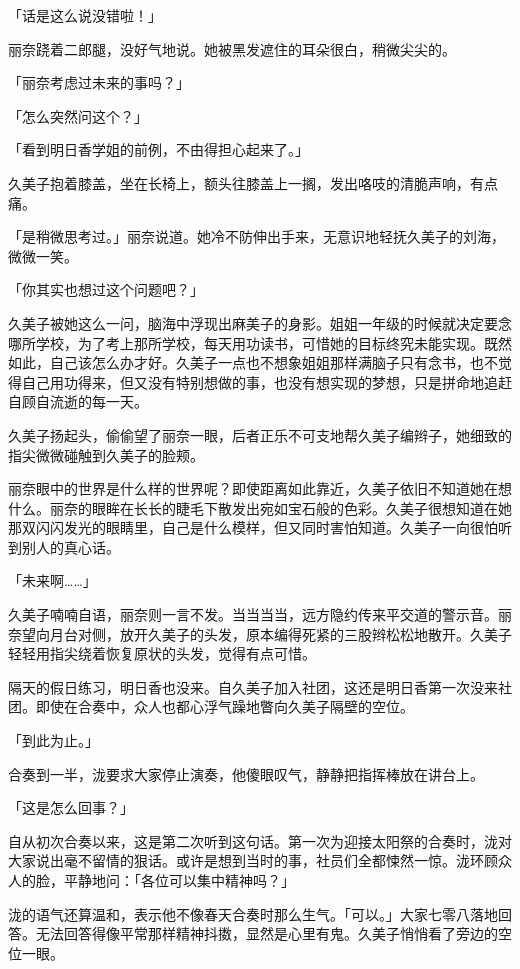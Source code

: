 \documentclass[UTF8]{ctexart}
\begin{document}
    「话是这么说没错啦！」 

    丽奈跷着二郎腿，没好气地说。她被黑发遮住的耳朵很白，稍微尖尖的。 

    「丽奈考虑过未来的事吗？」 

    「怎么突然问这个？」 

    「看到明日香学姐的前例，不由得担心起来了。」 

    久美子抱着膝盖，坐在长椅上，额头往膝盖上一搁，发出咯吱的清脆声响，有点痛。 

    「是稍微思考过。」丽奈说道。她冷不防伸出手来，无意识地轻抚久美子的刘海，微微一笑。 

    「你其实也想过这个问题吧？」 

    久美子被她这么一问，脑海中浮现出麻美子的身影。姐姐一年级的时候就决定要念哪所学校，为了考上那所学校，每天用功读书，可惜她的目标终究未能实现。既然如此，自己该怎么办才好。久美子一点也不想象姐姐那样满脑子只有念书，也不觉得自己用功得来，但又没有特别想做的事，也没有想实现的梦想，只是拼命地追赶自顾自流逝的每一天。 

    久美子扬起头，偷偷望了丽奈一眼，后者正乐不可支地帮久美子编辫子，她细致的指尖微微碰触到久美子的脸颊。 

    丽奈眼中的世界是什么样的世界呢？即使距离如此靠近，久美子依旧不知道她在想什么。丽奈的眼眸在长长的睫毛下散发出宛如宝石般的色彩。久美子很想知道在她那双闪闪发光的眼睛里，自己是什么模样，但又同时害怕知道。久美子一向很怕听到别人的真心话。 

    「未来啊……」 

    久美子喃喃自语，丽奈则一言不发。当当当当，远方隐约传来平交道的警示音。丽奈望向月台对侧，放开久美子的头发，原本编得死紧的三股辫松松地散开。久美子轻轻用指尖绕着恢复原状的头发，觉得有点可惜。 

    隔天的假日练习，明日香也没来。自久美子加入社团，这还是明日香第一次没来社团。即使在合奏中，众人也都心浮气躁地瞥向久美子隔壁的空位。 

    「到此为止。」 

    合奏到一半，泷要求大家停止演奏，他傻眼叹气，静静把指挥棒放在讲台上。 

    「这是怎么回事？」 

    自从初次合奏以来，这是第二次听到这句话。第一次为迎接太阳祭的合奏时，泷对大家说出毫不留情的狠话。或许是想到当时的事，社员们全都悚然一惊。泷环顾众人的脸，平静地问：「各位可以集中精神吗？」 

    泷的语气还算温和，表示他不像春天合奏时那么生气。「可以。」大家七零八落地回答。无法回答得像平常那样精神抖擞，显然是心里有鬼。久美子悄悄看了旁边的空位一眼。 
\end{document}
